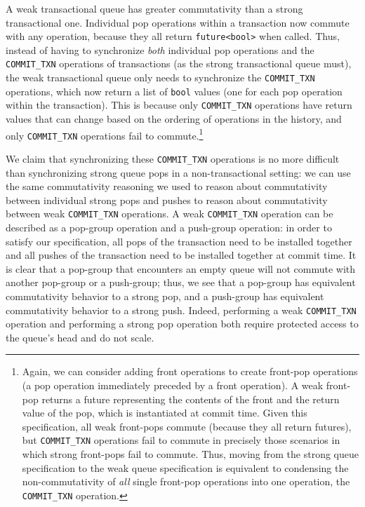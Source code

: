 A weak transactional queue has greater commutativity than a strong transactional one. Individual pop operations within a transaction now commute with any operation, because they all return \texttt{future<bool>} when called. Thus, instead of having to synchronize \emph{both} individual pop operations and the \texttt{COMMIT\_TXN} operations of transactions (as the strong transactional queue must), the weak transactional queue only needs to synchronize the \texttt{COMMIT\_TXN} operations, which now return a list of \texttt{bool} values (one for each pop operation within the transaction). This is because only \texttt{COMMIT\_TXN} operations have return values that can change based on the ordering of operations in the history, and only \texttt{COMMIT\_TXN} operations fail to commute.\footnote{Again, we can consider adding front operations to create front-pop operations (a pop operation immediately preceded by a front operation). A weak front-pop returns a future representing the contents of the front and the return value of the pop, which is instantiated at commit time. Given this specification, all weak front-pops commute (because they all return futures), but \texttt{COMMIT\_TXN} operations fail to commute in precisely those scenarios in which strong front-pops fail to commute. Thus, moving from the strong queue specification to the weak queue specification is equivalent to condensing the non-commutativity of \emph{all} single front-pop operations into one operation, the \texttt{COMMIT\_TXN} operation.}

We claim that synchronizing these \texttt{COMMIT\_TXN} operations is no more difficult than synchronizing strong queue pops in a non-transactional setting: we can use the same commutativity reasoning we used to reason about commutativity between individual strong pops and pushes to reason about commutativity between weak \texttt{COMMIT\_TXN} operations. A weak \texttt{COMMIT\_TXN} operation can be described as a pop-group operation and a push-group operation: in order to satisfy our specification, all pops of the transaction need to be installed together and all pushes of the transaction need to be installed together at commit time. It is clear that a pop-group that encounters an empty queue will not commute with another pop-group or a push-group; thus, we see that a pop-group has equivalent commutativity behavior to a strong pop, and a push-group has equivalent commutativity behavior to a strong push. Indeed, performing a weak \texttt{COMMIT\_TXN} operation and performing a strong pop operation both require protected access to the queue's head and do not scale.


